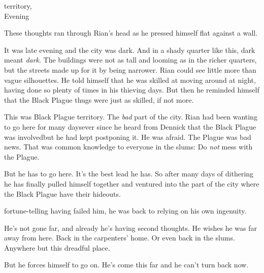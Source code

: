 \begin{comment}
\section{Rian is threatened by a thug}
\end{comment}
\stamp
  {\dateRianAndJorgen}
  {%
     territory, 
    \\
    Evening%
  }

These thoughts ran through Rian's head as he pressed himself flat against a wall. 

It was late evening and the city was dark. 
And in a shady quarter like this, dark meant \emph{dark}. 
The buildings were not as tall and looming as in the richer quarters, but the streets made up for it by being narrower. 
Rian could see little more than vague silhouettes. 
He told himself that he was skilled at moving around at night, having done so plenty of times in his thieving days. 
But then he reminded himself that the Black Plague thugs were just as skilled, if not more. 


This was Black Plague territory. 
The \emph{bad} part of the city. 
Rian had been wanting to go here for many days\dash ever since he heard from Dennick that the Black Plague was involved\dash but he had kept postponing it.
He was afraid. 
The Plague was bad news. 
That was common knowledge to everyone in the slums: 
Do \emph{not} mess with the Plague. 

But he has to go here. 
It's the best lead he has. 
So after many days of dithering he has finally pulled himself together and ventured into the part of the city where the Black Plague have their hideouts. 

\Uswaz{} fortune-telling having failed him, he was back to relying on his own ingenuity. 

He's not gone far, and already he's having second thoughts. 
He wishes he was far away from here. 
Back in the carpenters' home. 
Or even back in the slums. 
Anywhere but this dreadful place. 


But he forces himself to go on. 
He's come this far and he can't turn back now. 

